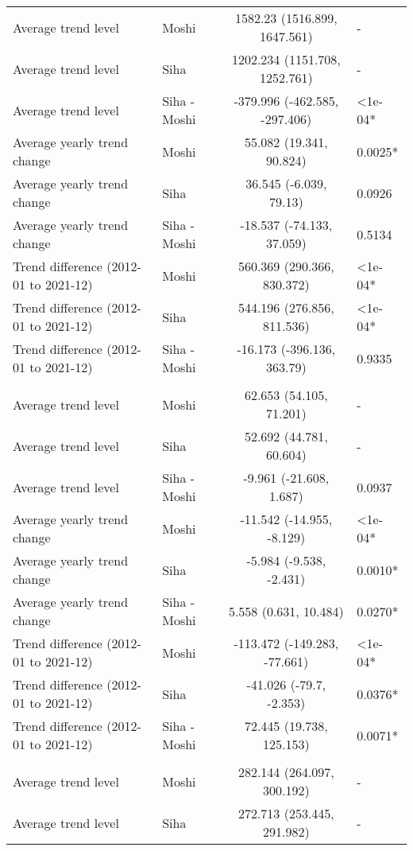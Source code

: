 \begin{longtable}{l|lcl}
Average trend level & Moshi & 1582.23 (1516.899, 1647.561) & - \\ 
Average trend level & Siha & 1202.234 (1151.708, 1252.761) & - \\ 
Average trend level & Siha - Moshi & -379.996 (-462.585, -297.406) & <1e-04* \\ 
Average yearly trend change & Moshi & 55.082 (19.341, 90.824) & 0.0025* \\ 
Average yearly trend change & Siha & 36.545 (-6.039, 79.13) & 0.0926 \\ 
Average yearly trend change & Siha - Moshi & -18.537 (-74.133, 37.059) & 0.5134 \\ 
Trend difference (2012-01 to 2021-12) & Moshi & 560.369 (290.366, 830.372) & <1e-04* \\ 
Trend difference (2012-01 to 2021-12) & Siha & 544.196 (276.856, 811.536) & <1e-04* \\ 
Trend difference (2012-01 to 2021-12) & Siha - Moshi & -16.173 (-396.136, 363.79) & 0.9335 \\ 
\midrule\addlinespace[2.5pt]
\multicolumn{4}{l}{Malnutrition} \\[2.5pt] 
\midrule\addlinespace[2.5pt]
Average trend level & Moshi & 62.653 (54.105, 71.201) & - \\ 
Average trend level & Siha & 52.692 (44.781, 60.604) & - \\ 
Average trend level & Siha - Moshi & -9.961 (-21.608, 1.687) & 0.0937 \\ 
Average yearly trend change & Moshi & -11.542 (-14.955, -8.129) & <1e-04* \\ 
Average yearly trend change & Siha & -5.984 (-9.538, -2.431) & 0.0010* \\ 
Average yearly trend change & Siha - Moshi & 5.558 (0.631, 10.484) & 0.0270* \\ 
Trend difference (2012-01 to 2021-12) & Moshi & -113.472 (-149.283, -77.661) & <1e-04* \\ 
Trend difference (2012-01 to 2021-12) & Siha & -41.026 (-79.7, -2.353) & 0.0376* \\ 
Trend difference (2012-01 to 2021-12) & Siha - Moshi & 72.445 (19.738, 125.153) & 0.0071* \\ 
\midrule\addlinespace[2.5pt]
\multicolumn{4}{l}{Diarrhea} \\[2.5pt] 
\midrule\addlinespace[2.5pt]
Average trend level & Moshi & 282.144 (264.097, 300.192) & - \\ 
Average trend level & Siha & 272.713 (253.445, 291.982) & - \\ 

\end{longtable}
